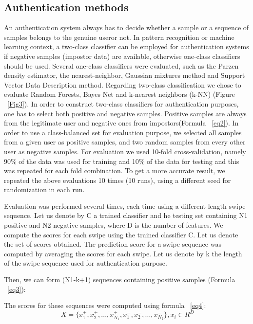 \documentclass[referee]{raa}            %
\begin{document}
\subsection{Authentication methods}
An authentication system always has to decide whether a sample or a sequence of samples belongs to the genuine useror not. In pattern recognition or machine learning context, a two-class classifier can be employed for authentication systems if negative samples (impostor data) are available, otherwise one-class classifiers should be used. Several one-class classifiers were evaluated, such as the Parzen density estimator, the nearest-neighbor, Gaussian mixtures method and Support Vector Data Description method. Regarding two-class classification we chose to evaluate Random Forests, Bayes Net and k-nearest neighbors (k-NN) (Figure ~\eqref{Fig3}). In order to construct two-class classifiers for authentication purposes, one has to select both positive and negative samples. Positive samples are always from the legitimate user and negative ones from impostors(Formula ~\eqref{eq2}). In order to use a class-balanced set for evaluation purpose, we selected all samples from a given user as positive samples, and two random samples from every other user as negative samples. For evaluation we used 10-fold cross-validation, namely 90\% of the data was used for training and 10\% of the data for testing and this was repeated for each fold combination. To get a more accurate result, we repeated the above evaluations 10 times (10 runs), using a different seed for randomization in each run. \par
Evaluation was performed several times, each time using a different length swipe sequence. Let us denote by C a trained classifier and he testing set containing N1 positive and N2 negative samples, where D is the number of features. We compute the scores for each swipe using the trained classifier C. Let us denote the set of scores obtained. The prediction score for a swipe sequence was computed by averaging the scores for each swipe. Let us denote by k the length of the swipe sequence used for authentication purpose. 
\par
Then, we can form (N1-k+1) sequences containing positive samples (Formula ~\eqref{eq3}):
\par
The scores for these sequences were computed using formula ~\eqref{eq4}:
\begin{equation}\label{eq1}
  \ X = \{x_1^+,x_2^+,...,x_{N_1}^+,x_1^-,x_2^-,...,x_{N_2}^-\}, x_i \in R^D
\end{equation}
\end{document}
